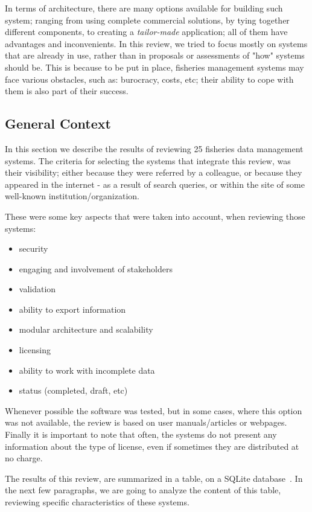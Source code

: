 \documentclass[11pt]{article} %
\begin{document}
In terms of architecture, there are many options available for building such system; ranging from using complete commercial solutions, by tying together different components, to creating a \emph{tailor-made} application; all of them have advantages and inconvenients. In this review, we tried to focus mostly on systems that are already in use, rather than in proposals or assessments of "how" systems should be. This is because to be put in place, fisheries management systems may face various obstacles, such as: burocracy, costs, etc; their ability to cope with them is also part of their success. 

\subsection{General Context}\label{context}
In this section we describe the results of reviewing 25 fisheries data management systems. The criteria for selecting the systems that integrate this review, was their visibility; either because they were referred by a colleague, or because they appeared in the internet - as a result of search queries, or within the site of some well-known institution/organization.

These were some key aspects that were taken into account, when reviewing those systems:
\begin{itemize}
\item security
\item engaging and involvement of stakeholders
\item validation    
\item ability to export information  
\item modular architecture and scalability   
\item licensing     
\item ability to work with incomplete data     
\item status (completed, draft, etc)     
\end{itemize}    
    
Whenever possible the software was tested, but in some cases, where this option was not available, the review is based on user manuals/articles or webpages. Finally it is important to note that often, the systems do not present any information about the type of license, even if sometimes they are distributed at no charge. 

The results of this review, are summarized in a table, on a SQLite database~\cite{bd}. In the next few paragraphs, we are going to analyze the content of this table, reviewing specific characteristics of these systems.
\end{document}
